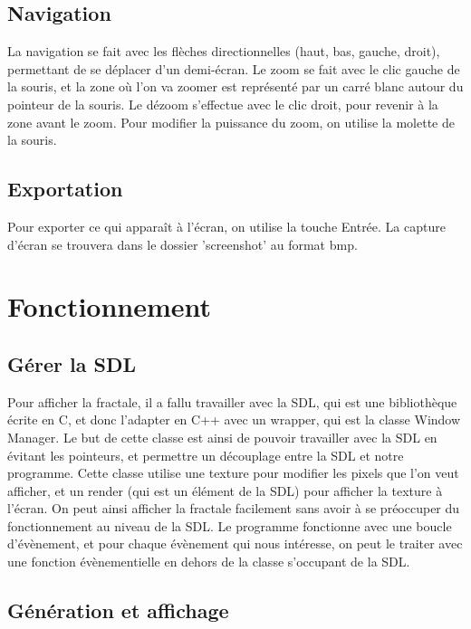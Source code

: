 \documentclass{article}
\begin{document}
	\subsection{Navigation}

	La navigation se fait avec les flèches directionnelles (haut, bas, gauche, droit), permettant de se déplacer d'un demi-écran.
	Le zoom se fait avec le clic gauche de la souris, et la zone où l'on va zoomer est représenté par un carré blanc autour du pointeur de la souris.
	Le dézoom s'effectue avec le clic droit, pour revenir à la zone avant le zoom.
	Pour modifier la puissance du zoom, on utilise la molette de la souris.

	\subsection{Exportation}

	Pour exporter ce qui apparaît à l'écran, on utilise la touche Entrée.
	La capture d'écran se trouvera dans le dossier 'screenshot' au format bmp.

	\section{Fonctionnement}

	\subsection{Gérer la SDL}

	Pour afficher la fractale, il a fallu travailler avec la SDL, qui est une bibliothèque écrite en C, et donc l'adapter en C++ avec un wrapper, qui est la classe Window Manager.
	Le but de cette classe est ainsi de pouvoir travailler avec la SDL en évitant les pointeurs, et permettre un découplage entre la SDL et notre programme.
	Cette classe utilise une texture pour modifier les pixels que l'on veut afficher, et un render (qui est un élément de la SDL) pour afficher la texture à l'écran.
	On peut ainsi afficher la fractale facilement sans avoir à se préoccuper du fonctionnement au niveau de la SDL.
	Le programme fonctionne avec une boucle d'évènement, et pour chaque évènement qui nous intéresse, on peut le traiter avec une fonction évènementielle en dehors de la classe s'occupant de la SDL.

	\subsection{Génération et affichage}
\end{document}
